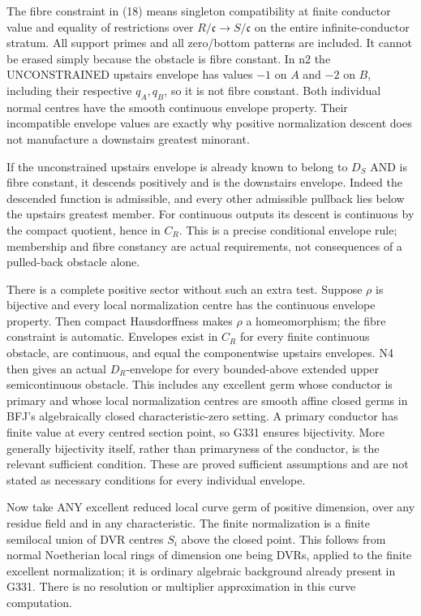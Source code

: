 \documentclass[11pt]{article}
\begin{document}
The fibre constraint in (18) means singleton compatibility at finite conductor value and equality of restrictions over \(R/\mathfrak c\to S/\mathfrak c\) on the entire infinite-conductor stratum. All support primes and all zero/bottom patterns are included. It cannot be erased simply because the obstacle is fibre constant. In n2 the UNCONSTRAINED upstairs envelope has values \(-1\) on \(A\) and \(-2\) on \(B\), including their respective \(q_A,q_B\), so it is not fibre constant. Both individual normal centres have the smooth continuous envelope property. Their incompatible envelope values are exactly why positive normalization descent does not manufacture a downstairs greatest minorant.

If the unconstrained upstairs envelope is already known to belong to \(D_S\) AND is fibre constant, it descends positively and is the downstairs envelope. Indeed the descended function is admissible, and every other admissible pullback lies below the upstairs greatest member. For continuous outputs its descent is continuous by the compact quotient, hence in \(C_R\). This is a precise conditional envelope rule; membership and fibre constancy are actual requirements, not consequences of a pulled-back obstacle alone.

There is a complete positive sector without such an extra test. Suppose \(\rho\) is bijective and every local normalization centre has the continuous envelope property. Then compact Hausdorffness makes \(\rho\) a homeomorphism; the fibre constraint is automatic. Envelopes exist in \(C_R\) for every finite continuous obstacle, are continuous, and equal the componentwise upstairs envelopes. N4 then gives an actual \(D_R\)-envelope for every bounded-above extended upper semicontinuous obstacle. This includes any excellent germ whose conductor is primary and whose local normalization centres are smooth affine closed germs in BFJ's algebraically closed characteristic-zero setting. A primary conductor has finite value at every centred section point, so G331 ensures bijectivity. More generally bijectivity itself, rather than primaryness of the conductor, is the relevant sufficient condition. These are proved sufficient assumptions and are not stated as necessary conditions for every individual envelope.

Now take ANY excellent reduced local curve germ of positive dimension, over any residue field and in any characteristic. The finite normalization is a finite semilocal union of DVR centres \(S_i\) above the closed point. This follows from normal Noetherian local rings of dimension one being DVRs, applied to the finite excellent normalization; it is ordinary algebraic background already present in G331. There is no resolution or multiplier approximation in this curve computation.
\end{document}
